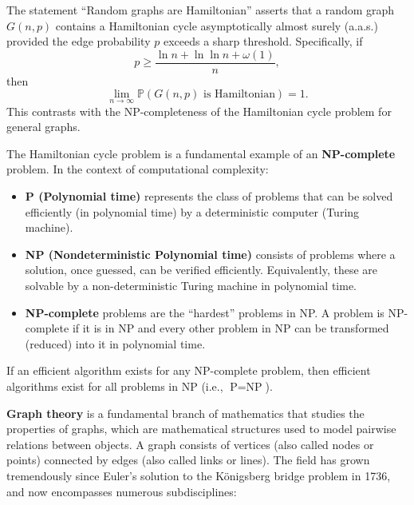 \documentclass[11pt, a4paper]{ctexrep}
\begin{document}
\begin{remark}
    The statement ``Random graphs are Hamiltonian'' asserts that a random graph $G(n, p)$ contains a Hamiltonian cycle asymptotically almost surely (a.a.s.) provided the edge probability $p$ exceeds a sharp threshold. Specifically, if
    \[
        p \ge \frac{\ln n + \ln \ln n + \omega(1)}{n},
    \]
    then
    \[
        \lim_{n \to \infty} \mathbb{P}(G(n, p) \text{ is Hamiltonian}) = 1.
    \]
    This contrasts with the NP-completeness of the Hamiltonian cycle problem for general graphs.
\end{remark}

The Hamiltonian cycle problem is a fundamental example of an \textbf{NP-complete} problem. In the context of computational complexity:
\begin{itemize}
    \item \textbf{P (Polynomial time)} represents the class of problems that can be solved efficiently (in polynomial time) by a deterministic computer (Turing machine).
    \item \textbf{NP (Nondeterministic Polynomial time)} consists of problems where a solution, once guessed, can be verified efficiently. Equivalently, these are solvable by a non-deterministic Turing machine in polynomial time.
    \item \textbf{NP-complete} problems are the ``hardest'' problems in NP. A problem is NP-complete if it is in NP and every other problem in NP can be transformed (reduced) into it in polynomial time.
\end{itemize}
If an efficient algorithm exists for any NP-complete problem, then efficient algorithms exist for all problems in NP (i.e., $\text{P} = \text{NP}$).

\textbf{Graph theory} is a fundamental branch of mathematics that studies the properties of graphs, which are mathematical structures used to model pairwise relations between objects. A graph consists of vertices (also called nodes or points) connected by edges (also called links or lines). The field has grown tremendously since Euler's solution to the Königsberg bridge problem in 1736, and now encompasses numerous subdisciplines:
\end{document}
